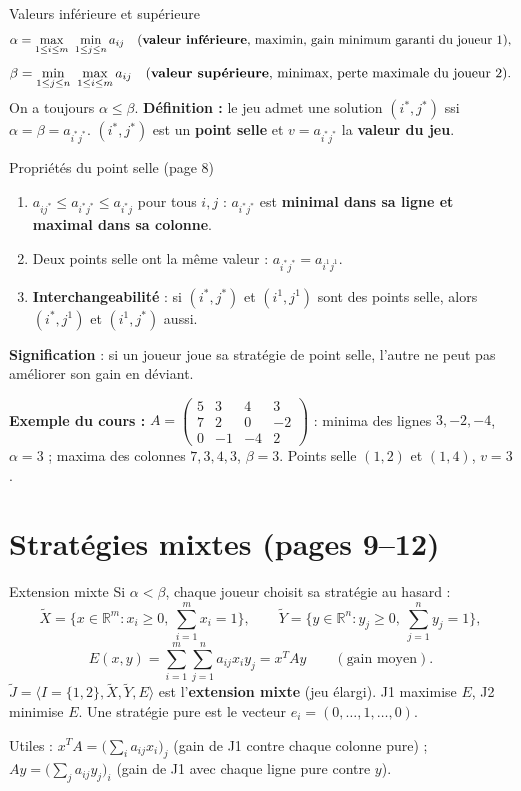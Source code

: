 \documentclass[11pt,a4paper]{article}
\newcommand{\Xt}{\tilde{X}}
\newcommand{\Yt}{\tilde{Y}}
\begin{document}
\begin{propbox}{Valeurs inférieure et supérieure}
\[
\alpha=\max_{1\le i\le m}\ \min_{1\le j\le n}a_{ij}\quad(\text{\textbf{valeur inférieure}, maximin, gain minimum garanti du joueur 1}),
\]
\[
\beta=\min_{1\le j\le n}\ \max_{1\le i\le m}a_{ij}\quad(\text{\textbf{valeur supérieure}, minimax, perte maximale du joueur 2}).
\]
On a toujours $\alpha\le\beta$. \textbf{Définition :} le jeu admet une solution $(i^*,j^*)$ ssi $\alpha=\beta=a_{i^*j^*}$. $(i^*,j^*)$ est un \textbf{point selle} et $v=a_{i^*j^*}$ la \textbf{valeur du jeu}.
\end{propbox}

\begin{propbox}{Propriétés du point selle (page 8)}
\begin{enumerate}[leftmargin=*]
\item $a_{ij^*}\le a_{i^*j^*}\le a_{i^*j}$ pour tous $i,j$ : $a_{i^*j^*}$ est \textbf{minimal dans sa ligne et maximal dans sa colonne}.
\item Deux points selle ont la même valeur : $a_{i^*j^*}=a_{i^1j^1}$.
\item \textbf{Interchangeabilité} : si $(i^*,j^*)$ et $(i^1,j^1)$ sont des points selle, alors $(i^*,j^1)$ et $(i^1,j^*)$ aussi.
\end{enumerate}
\textbf{Signification} : si un joueur joue sa stratégie de point selle, l'autre ne peut pas améliorer son gain en déviant.
\end{propbox}

\textbf{Exemple du cours :} $A=\begin{pmatrix}5&3&4&3\\7&2&0&-2\\0&-1&-4&2\end{pmatrix}$ : minima des lignes $3,-2,-4$, $\alpha=3$ ; maxima des colonnes $7,3,4,3$, $\beta=3$. Points selle $(1,2)$ et $(1,4)$, $v=3$.

\section{Stratégies mixtes (pages 9--12)}

\begin{propbox}{Extension mixte}
Si $\alpha<\beta$, chaque joueur choisit sa stratégie au hasard :
\[
\Xt=\Big\{x\in\mathbb{R}^m: x_i\ge0,\ \sum_{i=1}^m x_i=1\Big\},\qquad \Yt=\Big\{y\in\mathbb{R}^n: y_j\ge0,\ \sum_{j=1}^n y_j=1\Big\},
\]
\[
E(x,y)=\sum_{i=1}^m\sum_{j=1}^n a_{ij}x_iy_j=x^TAy\qquad(\text{gain moyen}).
\]
$\tilde J=\langle I=\{1,2\},\Xt,\Yt,E\rangle$ est l'\textbf{extension mixte} (jeu élargi). J1 maximise $E$, J2 minimise $E$. Une stratégie pure est le vecteur $e_i=(0,\dots,1,\dots,0)$.

Utiles : $x^TA=\big(\sum_i a_{ij}x_i\big)_j$ (gain de J1 contre chaque colonne pure) ; $Ay=\big(\sum_j a_{ij}y_j\big)_i$ (gain de J1 avec chaque ligne pure contre $y$).
\end{propbox}
\end{document}

